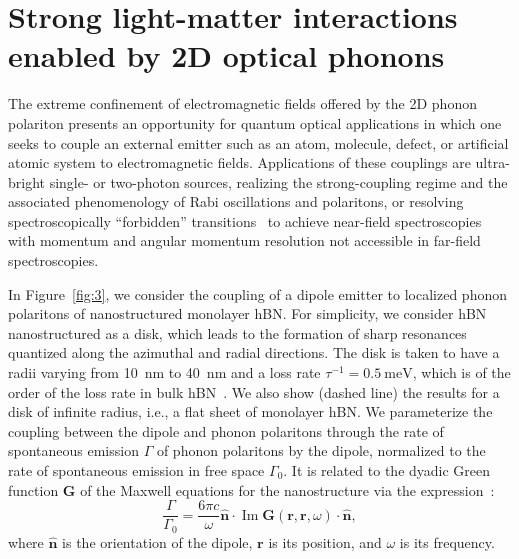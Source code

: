 \documentclass[aps,prb,twocolumn,
	           groupedaddress,superscriptaddress,
               amsfonts,amssymb,amsmath,floatfix,
	           citeautoscript]{revtex4-1}
\renewcommand{\Im}{\operatorname{Im}}
\begin{document}
\section{Strong light-matter interactions enabled by 2D optical phonons}

The extreme confinement of electromagnetic fields offered by the 2D phonon polariton presents an opportunity for quantum optical applications in which one seeks to couple an external emitter such as an atom, molecule, defect, or artificial atomic system to electromagnetic fields. Applications of these couplings are ultra-bright single- or two-photon sources, realizing the strong-coupling regime and the associated phenomenology of Rabi oscillations and polaritons, or resolving spectroscopically ``forbidden'' transitions~\cite{koppens2011graphene,autore2018boron,rivera2016shrinking,rivera2017making,kurman2018control} to achieve near-field spectroscopies with momentum and angular momentum resolution not accessible in far-field spectroscopies.

In Figure~\ref{fig:3}, we consider the coupling of a dipole emitter to localized phonon polaritons of nanostructured monolayer hBN. For simplicity, we consider hBN nanostructured as a disk, which leads to the formation of sharp resonances quantized along the azimuthal and radial directions. The disk is taken to have a radii varying from \SI{10}{\nm} to \SI{40}{nm}
and a loss rate $\tau^{-1} = \SI{0.5}{\meV}$, which is of the order of the loss rate in bulk hBN~\cite{caldwell2014sub, dai2014tunable}. We also show (dashed line) the results for a disk of infinite radius, i.e., a flat sheet of monolayer hBN. We parameterize the coupling between the dipole and phonon polaritons through the rate of spontaneous emission $\Gamma$ of phonon polaritons by the dipole, normalized to the rate of spontaneous emission in free space $\Gamma_0$. It is related to the dyadic Green function $\mathbf{G}$ of the Maxwell equations for the nanostructure via the expression~\cite{novotny2012principles}:
\begin{equation}
	\frac{\Gamma}{\Gamma_0} 
	=  \frac{6\pi c}{\omega}\hat{\mathbf{n}}\cdot\Im\mathbf{G}(\mathbf{r},\mathbf{r},\omega)\cdot\hat{\mathbf{n}},
\end{equation}
where $\hat{\mathbf{n}}$ is the orientation of the dipole, $\mathbf{r}$ is its position, and $\omega$ is its frequency.
\end{document}
